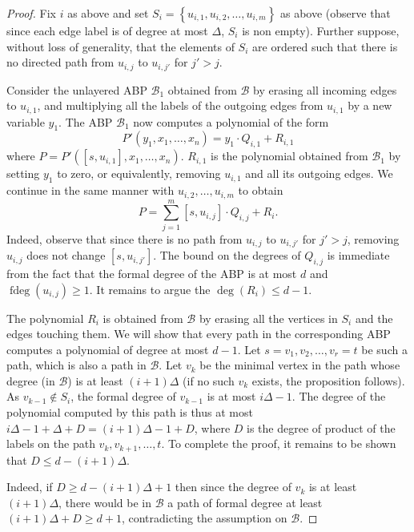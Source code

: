 \documentclass[10pt,a4paper]{article}
\DeclareMathOperator{\fdeg}{fdeg}
\newcommand{\set}[1]{\left\{#1\right\}}
\begin{document}
\begin{proof}
Fix $i$ as above and set $S_i = \set{u_{i,1}, u_{i,2}, \ldots, u_{i,m}}$ as above (observe that since each edge label is of degree at most $\Delta$, $S_i$ is non empty). Further suppose, without loss of generality, that the elements of $S_i$ are ordered such that there is no directed path from $u_{i,j}$ to $u_{i,j'}$ for $j' > j$.

Consider the unlayered ABP $\mathcal{B}_1$ obtained from $\mathcal{B}$ by erasing all incoming edges to $u_{i,1}$, and multiplying all the labels of the outgoing edges from $u_{i,1}$ by a new variable $y_1$. The ABP $\mathcal{B}_1$ now computes a polynomial of the form
\[
	P'(y_1, x_1, \ldots, x_n) = y_1 \cdot Q_{i,1} + R_{i,1}
\]
where $P = P'([s,u_{i,1}], x_1, \ldots, x_n)$. $R_{i,1}$ is the polynomial obtained from $\mathcal{B}_1$ by setting $y_1$ to zero, or equivalently, removing $u_{i,1}$ and all its outgoing edges. We continue in the same manner with $u_{i,2}, \ldots, u_{i,m}$ to obtain
\[
P = \sum_{j=1}^m [s,u_{i,j}] \cdot Q_{i,j} + R_i.
\]
Indeed, observe that since there is no path from $u_{i,j}$ to $u_{i,j'}$ for $j' > j$, removing $u_{i,j}$ does not change $[s,u_{i,j'}]$. The bound on the degrees of $Q_{i,j}$ is immediate from the fact that the formal degree of the ABP is at most $d$ and $\fdeg(u_{i,j}) \ge 1$. It remains to argue the $\deg(R_i) \le d-1$.

The polynomial $R_i$ is obtained from $\mathcal{B}$ by erasing all the vertices in $S_i$ and the edges touching them. We will show that every path in the corresponding ABP computes a polynomial of degree at most $d-1$. Let $s=v_1, v_2, \ldots, v_r=t$  be such a path, which is also a path in $\mathcal{B}$. Let $v_k$ be the minimal vertex in the path whose degree (in $\mathcal{B}$) is at least $(i+1)\Delta$
(if no such $v_k$ exists, the proposition follows).
As $v_{k-1} \not \in S_i$, the formal degree of $v_{k-1}$ is at most $i \Delta - 1$.
The degree of the polynomial computed by this path is thus at most $i\Delta - 1 + \Delta + D = (i+1)\Delta - 1 + D$, where $D$ is the degree of product of the labels on the path $v_k, v_{k+1}, \ldots, t$. To complete the proof, it remains to be shown that $D \le d - (i+1)\Delta$.

Indeed, if $D \ge d - (i+1)\Delta + 1$ then since the degree of $v_k$ is at least $(i+1)\Delta$, there would be in $\mathcal{B}$ a path of formal degree at least $(i+1)\Delta +D \ge d + 1$, contradicting the assumption on $\mathcal{B}$.
\end{proof}
\end{document}
